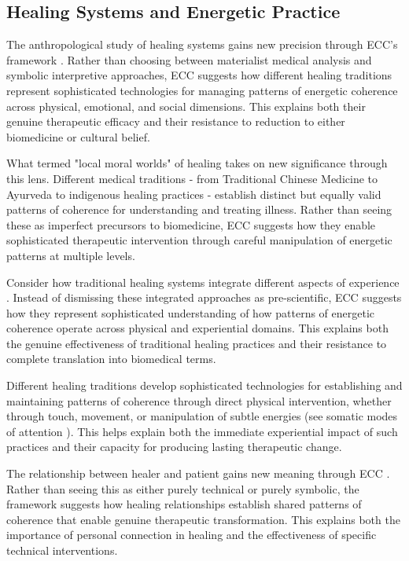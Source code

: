 \subsection{Healing Systems and Energetic Practice}

The anthropological study of healing systems gains new precision through ECC's framework \cite{csordas1993somatic}. Rather than choosing between materialist medical analysis and symbolic interpretive approaches, ECC suggests how different healing traditions represent sophisticated technologies for managing patterns of energetic coherence across physical, emotional, and social dimensions. This explains both their genuine therapeutic efficacy and their resistance to reduction to either biomedicine or cultural belief.

What \cite{kleinman1980patients} termed "local moral worlds" of healing takes on new significance through this lens. Different medical traditions - from Traditional Chinese Medicine to Ayurveda to indigenous healing practices - establish distinct but equally valid patterns of coherence for understanding and treating illness. Rather than seeing these as imperfect precursors to biomedicine, ECC suggests how they enable sophisticated therapeutic intervention through careful manipulation of energetic patterns at multiple levels.

Consider how traditional healing systems integrate different aspects of experience \cite{kapferer1991celebration}. Instead of dismissing these integrated approaches as pre-scientific, ECC suggests how they represent sophisticated understanding of how patterns of energetic coherence operate across physical and experiential domains. This explains both the genuine effectiveness of traditional healing practices and their resistance to complete translation into biomedical terms.

Different healing traditions develop sophisticated technologies for establishing and maintaining patterns of coherence through direct physical intervention, whether through touch, movement, or manipulation of subtle energies (see somatic modes of attention \cite{csordas1993somatic}). This helps explain both the immediate experiential impact of such practices and their capacity for producing lasting therapeutic change.

The relationship between healer and patient gains new meaning through ECC \cite{laderman1991taming}. Rather than seeing this as either purely technical or purely symbolic, the framework suggests how healing relationships establish shared patterns of coherence that enable genuine therapeutic transformation. This explains both the importance of personal connection in healing and the effectiveness of specific technical interventions.

